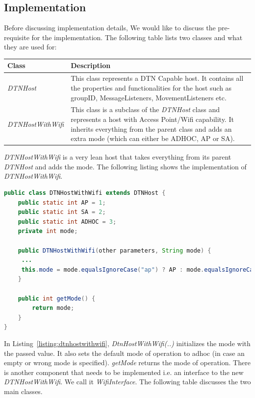 \subsection{Implementation}
Before discussing implementation details, We would like to discuss the pre-requisite for the implementation. The following table lists two classes and what they are used for:
	\begin{center}
	    \begin{tabular}{ | l | p{10.5cm} |}
    		\hline
    		\textbf{Class} & \textbf{Description} \\ \hline
    		\textit{DTNHost} & This class represents a DTN Capable host. It contains all the properties and functionalities for the host such as groupID, MessageListeners, MovementListeners etc. \\ \hline
    		\textit{DTNHostWithWifi} & This class is a subclass of the \textit{DTNHost} class and represents a host with Access Point/Wifi capability. It inherits everything from the parent class and adds an extra mode (which can either be ADHOC, AP or SA). \\ \hline
    	\end{tabular}
	\end{center}
\vspace{5mm}
\textit{DTNHostWithWifi} is a very lean host that takes everything from its parent \textit{DTNHost} and adds the mode. The following listing shows the implementation of \textit{DTNHostWithWifi}.\newline
\begin{lstlisting}[language=java]
public class DTNHostWithWifi extends DTNHost {
	public static int AP = 1;
	public static int SA = 2;
	public static int ADHOC = 3;
	private int mode;

	public DTNHostWithWifi(other parameters, String mode) {
	 ...
	 this.mode = mode.equalsIgnoreCase("ap") ? AP : mode.equalsIgnoreCase("sa") ? SA : ADHOC;
	}

	public int getMode() {
		return mode;
	}
}
\end{lstlisting}
\label{listing:dtnhostwithwifi}
\vspace{4mm}
In Listing~\ref{listing:dtnhostwithwifi}, \textit{DtnHostWithWifi(..)} initializes the mode with the passed value. It also sets the default mode of operation to adhoc (in case an empty or wrong mode is specified). \textit{getMode} returns the mode of operation.\newline
\newline
There is another component that needs to be implemented i.e. an interface to the new \textit{DTNHostWithWifi}. We call it \textit{WifiInterface}. The following table discusses the two main classes.

